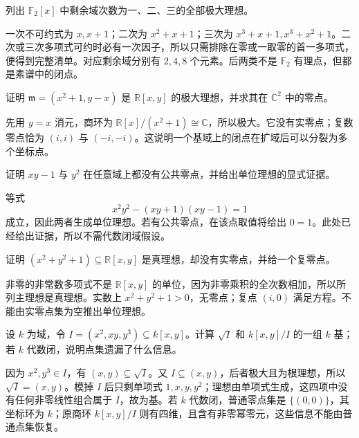 \begin{exercise}\label{b3:ex:06-finite-field-closed-points}
	列出 \(\mathbb F_2[x]\) 中剩余域次数为一、二、三的全部极大理想。
\end{exercise}
\begin{solution}
	一次不可约式为 \(x,x+1\)；二次为 \(x^2+x+1\)；三次为 \(x^3+x+1,x^3+x^2+1\)。二次或三次多项式可约时必有一次因子，所以只需排除在零或一取零的首一多项式，便得到完整清单。对应剩余域分别有 \(2,4,8\) 个元素。后两类不是 \(\mathbb F_2\) 有理点，但都是素谱中的闭点。
\end{solution}

\begin{exercise}\label{b3:ex:06-real-residue-field}
	证明 \(\mathfrak m=(x^2+1,y-x)\) 是 \(\mathbb R[x,y]\) 的极大理想，并求其在 \(\mathbb C^2\) 中的零点。
\end{exercise}
\begin{solution}
	先用 \(y=x\) 消元，商环为 \(\mathbb R[x]/(x^2+1)\cong\mathbb C\)，所以极大。它没有实零点；复数零点恰为 \((i,i)\) 与 \((-i,-i)\)。这说明一个基域上的闭点在扩域后可以分裂为多个坐标点。
\end{solution}

\begin{exercise}\label{b3:ex:06-unit-ideal-certificate}
	证明 \(xy-1\) 与 \(y^2\) 在任意域上都没有公共零点，并给出单位理想的显式证据。
\end{exercise}
\begin{solution}
	等式
	\[
		x^2y^2-(xy+1)(xy-1)=1
	\]
	成立，因此两者生成单位理想。若有公共零点，在该点取值将给出 \(0=1\)。此处已经给出证据，所以不需代数闭域假设。
\end{solution}

\begin{exercise}\label{b3:ex:06-empty-real-zero-set}
	证明 \((x^2+y^2+1)\subseteq\mathbb R[x,y]\) 是真理想，却没有实零点，并给一个复零点。
\end{exercise}
\begin{solution}
	非零的非常数多项式不是 \(\mathbb R[x,y]\) 的单位，因为非零乘积的全次数相加，所以所列主理想是真理想。实数上 \(x^2+y^2+1>0\)，无零点；复点 \((i,0)\) 满足方程。不能由实零点集为空推出单位理想。
\end{solution}

\begin{exercise}\label{b3:ex:06-fat-point-radical}
	设 \(k\) 为域，令 \(I=(x^2,xy,y^3)\subseteq k[x,y]\)。计算 \(\sqrt I\) 和 \(k[x,y]/I\) 的一组 \(k\) 基；若 \(k\) 代数闭，说明点集遗漏了什么信息。
\end{exercise}
\begin{solution}
	因为 \(x^2,y^3\in I\)，有 \((x,y)\subseteq\sqrt I\)。又 \(I\subseteq(x,y)\)，后者极大且为根理想，所以 \(\sqrt I=(x,y)\)。模掉 \(I\) 后只剩单项式 \(1,x,y,y^2\)；理想由单项式生成，这四项中没有任何非零线性组合属于 \(I\)，故为基。若 \(k\) 代数闭，普通零点集是 \(\{(0,0)\}\)，其坐标环为 \(k\)；原商环 \(k[x,y]/I\) 则有四维，且含有非零幂零元，这些信息不能由普通点集恢复。
\end{solution}

